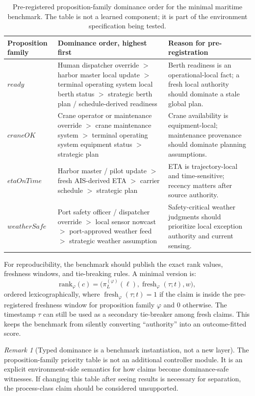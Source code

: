 \documentclass[11pt]{article}
\newcommand{\1}{\mathbf{1}}
\theoremstyle{definition}
\theoremstyle{plain}
\theoremstyle{remark}
\newtheorem{remark}[definition]{Remark}
\begin{document}
\begin{table}[t]
\centering
\small
\begin{tabularx}{\textwidth}{>{\raggedright\arraybackslash}p{}>{\raggedright\arraybackslash}p{}X}
\toprule
\textbf{Proposition family} & \textbf{Dominance order, highest first} & \textbf{Reason for pre-registration} \\
\midrule
$ready$ & Human dispatcher override $>$ harbor master local update $>$ terminal operating system local berth status $>$ strategic berth plan / schedule-derived readiness & Berth readiness is an operational-local fact; a fresh local authority should dominate a stale global plan. \\
$craneOK$ & Crane operator or maintenance override $>$ crane maintenance system $>$ terminal operating system equipment status $>$ strategic plan & Crane availability is equipment-local; maintenance provenance should dominate planning assumptions. \\
$etaOnTime$ & Harbor master / pilot update $>$ fresh AIS-derived ETA $>$ carrier schedule $>$ strategic plan & ETA is trajectory-local and time-sensitive; recency matters after source authority. \\
$weatherSafe$ & Port safety officer / dispatcher override $>$ local sensor nowcast $>$ port-approved weather feed $>$ strategic weather assumption & Safety-critical weather judgments should prioritize local exception authority and current sensing. \\
\bottomrule
\end{tabularx}
\caption{Pre-registered proposition-family dominance order for the minimal maritime benchmark. The table is not a learned component; it is part of the environment specification being tested.}
\label{supp:tab:dominance-prereg}
\end{table}

For reproducibility, the benchmark should publish the exact rank values, freshness windows, and tie-breaking rules. A minimal version is:
\[
\mathrm{rank}_{\varphi}(c)=\big(\pi_L^{(\varphi)}(\ell),\operatorname{fresh}_{\varphi}(\tau;t),w\big),
\]
ordered lexicographically, where $\operatorname{fresh}_{\varphi}(\tau;t)=1$ if the claim is inside the pre-registered freshness window for proposition family $\varphi$ and $0$ otherwise. The timestamp $\tau$ can still be used as a secondary tie-breaker among fresh claims. This keeps the benchmark from silently converting ``authority'' into an outcome-fitted score.

\begin{remark}[Typed dominance is a benchmark instantiation, not a new layer]
The proposition-family priority table is not an additional controller module. It is an explicit environment-side semantics for how claims become dominance-safe witnesses. If changing this table after seeing results is necessary for separation, the process-class claim should be considered unsupported.
\end{remark}
\end{document}
